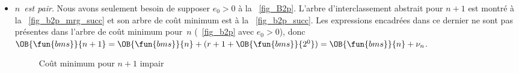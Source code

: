 \begin{itemize}

\item \emph{\(n\)~est pair}. Nous avons seulement besoin de supposer
  \(e_0 > 0\) à la \fig~\ref{fig_B2p}. L'arbre d'interclassement
  abstrait pour \(n+1\) est montré à la \fig~\vref{fig_b2p_mrg_succ}
  et son arbre de coût minimum est à la \fig~\ref{fig_b2p_succ}. Les
  expressions encadrées dans ce dernier ne sont pas présentes dans
  l'arbre de coût minimum pour~\(n\) (\fig~\vref{fig_b2p} avec \(e_0 >
  0\)), donc \(\OB{\fun{bms}}{n+1} = \OB{\fun{bms}}{n} + (r + 1 +
  \OB{\fun{bms}}{2^0}) = \OB{\fun{bms}}{n} + \nu_n\).
\begin{figure}[b]
\centering
{}
\quad
{}
\caption{Coût minimum pour \(n+1\) impair\label{fig_B2p_succ}}
\end{figure}

\medskip


\end{itemize}
